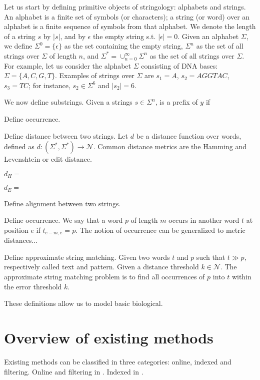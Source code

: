 Let us start by defining primitive objects of stringology: alphabets and strings. An alphabet is a finite set of symbols (or characters); a string (or word) over an alphabet is a finite sequence of symbols from that alphabet. We denote the length of a string $s$ by $\left| s \right|$, and by $\epsilon$ the empty string s.t. $\left| \epsilon \right|=0$.
Given an alphabet $\Sigma$, we define $\Sigma^0=\{ \epsilon \}$ as the set containing the empty string, $\Sigma^n$ as the set of all strings over $\Sigma$ of length $n$, and $\Sigma^* = \cup_{n=0}^{\infty}{\Sigma^n}$ as the set of all strings over $\Sigma$.
For example, let us consider the alphabet $\Sigma$ consisting of DNA bases: $\Sigma = \{A,C,G,T\}$. Examples of strings over $\Sigma$ are $s_1=A$, $s_2=AGGTAC$, $s_3=TC$; for instance, $s_2 \in \Sigma^6$ and $\left| s_2 \right| = 6$.

We now define substrings. Given a strings $s \in \Sigma^n$, is a prefix of $y$ if 



Define occurrence.


Define distance between two strings.
Let $d$ be a distance function over words, defined as $d : (\Sigma^{*}, \Sigma^{*}) \rightarrow \mathcal{N}$.
Common distance metrics are the Hamming and Levenshtein or edit distance.

$d_H = $

$d_E = $

Define alignment between two strings.




Define occurrence.
We say that a word $p$ of length $m$ occurs in another word $t$ at position $e$ if $t_{e-m, e} = p$.
The notion of occurrence can be generalized to metric distances...

Define approximate string matching.
Given two words $t$ and $p$ such that $t \gg p$, respectively called text and pattern. Given a distance threshold $k \in \mathcal{N}$.
The approximate string matching problem is to find all occurrences of $p$ into $t$ within the error threshold $k$.

These definitions allow us to model basic biological.



\section{Overview of existing methods}

Existing methods can be classified in three categories: online, indexed and filtering.
Online and filtering in \cite{Navarro1998}. Indexed in \cite{Navarro2001}.


